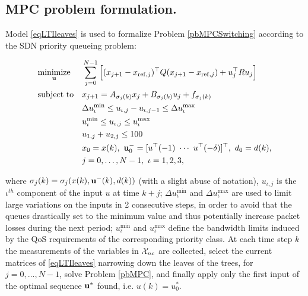 \subsection{MPC problem formulation.} Model \eqref{eqLTIleaves} is used to formalize Problem \ref{pbMPCSwitching} according to the SDN priority queueing problem:
\begin{problem}\label{pbMPC}

	\begin{equation*}
		\begin{aligned}
			& \underset{\bold u}
			{\text{minimize}}               & &  \sum_{j=0}^{N-1} \Big[(x_{j+1}-x_{\mathrm{ref},j})^\top Q (x_{j+1}-x_{\mathrm{ref},j}) + u^\top_{j} R u_{j}\Big]   \\
			& \text{subject to}             & &  x_{j+1}  =   A_{\sigma_j(k)} x_{j}+B_{\sigma_j(k)}  u_j+f_{\sigma_j(k)} \\
			&								& &  \Delta u_\iota^\mathrm{min} \leq u_{\iota,j} - u_{\iota,j-1} \leq \Delta u_\iota^\mathrm{max}             \\
			&								& &  u_\iota^\mathrm{min} \leq u_{\iota,j} \leq u_\iota^\mathrm{max}             \\
			&                               & &  u_{1,j} + u_{2,j} \leq 100			          		\\
			&                               & &  x_0 = x(k),\ \bold u^-_{0} = [u^\top(-1)\ \cdots\ u^\top(-\delta)]^\top,\ d_0 = d(k),\\
			&								& &  j = 0,\ldots,N-1,\ \iota = 1,2,3,                                 
		\end{aligned}
	\end{equation*}
	\normalsize
\end{problem}
\noindent where $\sigma_j(k) = \sigma_j(x(k),\bold{u^-}(k),d(k))$ (with a slight abuse of notation), $u_{\iota,j}$ is the $\iota^{th}$ component of the input $u$ at time $k+j$; $\Delta u_\iota^\mathrm{min}$ and $\Delta u_\iota^\mathrm{max}$ are used to limit large variations on the inputs in 2 consecutive steps, in order to avoid that the queues drastically set to the minimum value and thus potentially increase packet losses during the next period; $u_\iota^\mathrm{min}$ and $u_\iota^\mathrm{max}$ define the bandwidth limits induced by the QoS requirements of the corresponding priority class. At each time step $k$ the measurements of the variables in $\mathcal{X}_{nc}$ are collected, select the current matrices of \eqref{eqLTIleaves} narrowing down the leaves of the trees, for $j = 0,\ldots,N-1$, solve Problem \eqref{pbMPC}, and finally apply only the first input of the optimal sequence $\bold u^*$ found, i.e. $u(k) = u_0^*$.

